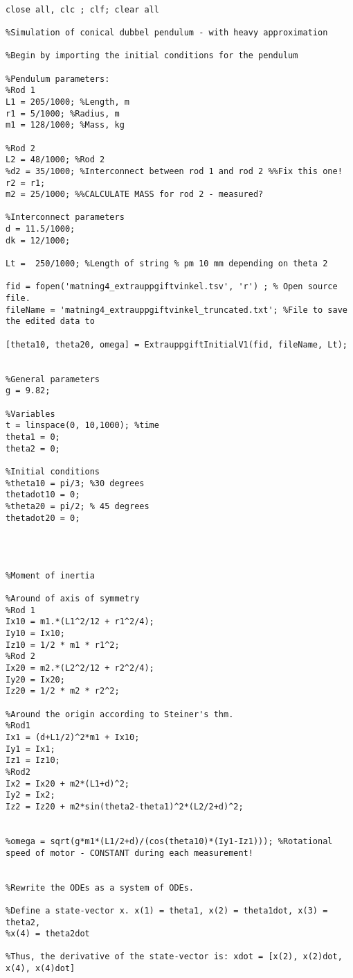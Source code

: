 \begin{lstlisting}[style=Matlab-editor]

close all, clc ; clf; clear all

%Simulation of conical dubbel pendulum - with heavy approximation

%Begin by importing the initial conditions for the pendulum

%Pendulum parameters: 
%Rod 1
L1 = 205/1000; %Length, m
r1 = 5/1000; %Radius, m
m1 = 128/1000; %Mass, kg

%Rod 2
L2 = 48/1000; %Rod 2
%d2 = 35/1000; %Interconnect between rod 1 and rod 2 %%Fix this one!
r2 = r1;
m2 = 25/1000; %%CALCULATE MASS for rod 2 - measured?

%Interconnect parameters
d = 11.5/1000;
dk = 12/1000;

Lt =  250/1000; %Length of string % pm 10 mm depending on theta 2

fid = fopen('matning4_extrauppgiftvinkel.tsv', 'r') ; % Open source file.
fileName = 'matning4_extrauppgiftvinkel_truncated.txt'; %File to save the edited data to

[theta10, theta20, omega] = ExtrauppgiftInitialV1(fid, fileName, Lt);


%General parameters
g = 9.82;

%Variables
t = linspace(0, 10,1000); %time
theta1 = 0;
theta2 = 0;

%Initial conditions
%theta10 = pi/3; %30 degrees
thetadot10 = 0;
%theta20 = pi/2; % 45 degrees
thetadot20 = 0;




%Moment of inertia 

%Around of axis of symmetry
%Rod 1
Ix10 = m1.*(L1^2/12 + r1^2/4);
Iy10 = Ix10;
Iz10 = 1/2 * m1 * r1^2;
%Rod 2
Ix20 = m2.*(L2^2/12 + r2^2/4);
Iy20 = Ix20;
Iz20 = 1/2 * m2 * r2^2;

%Around the origin according to Steiner's thm.
%Rod1
Ix1 = (d+L1/2)^2*m1 + Ix10;
Iy1 = Ix1;
Iz1 = Iz10;
%Rod2
Ix2 = Ix20 + m2*(L1+d)^2;
Iy2 = Ix2;
Iz2 = Iz20 + m2*sin(theta2-theta1)^2*(L2/2+d)^2;


%omega = sqrt(g*m1*(L1/2+d)/(cos(theta10)*(Iy1-Iz1))); %Rotational speed of motor - CONSTANT during each measurement!


%Rewrite the ODEs as a system of ODEs. 

%Define a state-vector x. x(1) = theta1, x(2) = theta1dot, x(3) = theta2,
%x(4) = theta2dot

%Thus, the derivative of the state-vector is: xdot = [x(2), x(2)dot, x(4), x(4)dot]


\end{lstlisting}
